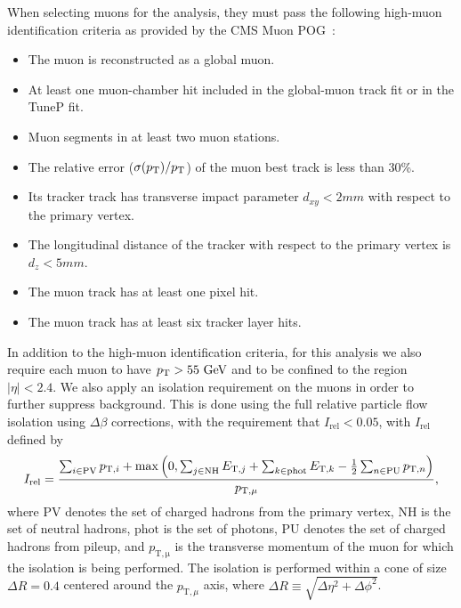 When selecting muons for the analysis, they must pass the following high-\pt muon identification criteria as provided by the CMS Muon POG~\cite{MuonSelection}:
\begin{itemize}
  \item The muon is reconstructed as a global muon.
  \item At least one muon-chamber hit included in the global-muon track fit or in the TuneP fit.
  \item Muon segments in at least two muon stations.
  \item The \pt relative error ($\sigma(\pt)/\pt$) of the muon best track is less than 30\%.
  \item Its tracker track has transverse impact parameter $d_{xy}<2\unit{mm}$ with respect to the primary vertex.
  \item The longitudinal distance of the tracker with respect to the primary vertex is $d_z<5\unit{mm}$.
  \item The muon track has at least one pixel hit.
  \item The muon track has at least six tracker layer hits.
\end{itemize}

In addition to the high-\pt muon identification criteria, for this analysis we also require each muon to have $\pt>55\unit{GeV}$ and to be confined to the region $|\eta|<2.4$.
We also apply an isolation requirement on the muons in order to further suppress background.
This is done using the full relative particle flow isolation using $\Delta\beta$ corrections, with the requirement that $I_\mathrm{rel}<0.05$, with $I_\mathrm{rel}$ defined by
\begin{equation}
  I_\mathrm{rel}=\frac{\sum_{i\in\mathrm{PV}}p_{\mathrm{T},i}+\max\pqty{0,\sum_{j\in\mathrm{NH}}E_{\mathrm{T},j}+\sum_{k\in\mathrm{phot}}E_{\mathrm{T},k}-\frac{1}{2}\sum_{n\in\mathrm{PU}}p_{\mathrm{T},n}}}{p_{\mathrm{T},\mu}},
\end{equation}
where $\mathrm{PV}$ denotes the set of charged hadrons from the primary vertex, $\mathrm{NH}$ is the set of neutral hadrons, $\mathrm{phot}$ is the set of photons, $\mathrm{PU}$ denotes the set of charged hadrons from pileup, and $p_\mathrm{T,\mu}$ is the transverse momentum of the muon for which the isolation is being performed.
The isolation is performed within a cone of size $\Delta R=0.4$ centered around the $p_{\mathrm{T},\mu}$ axis, where $\Delta R\equiv\sqrt{\Delta\eta^2+\Delta\phi^2}$.

